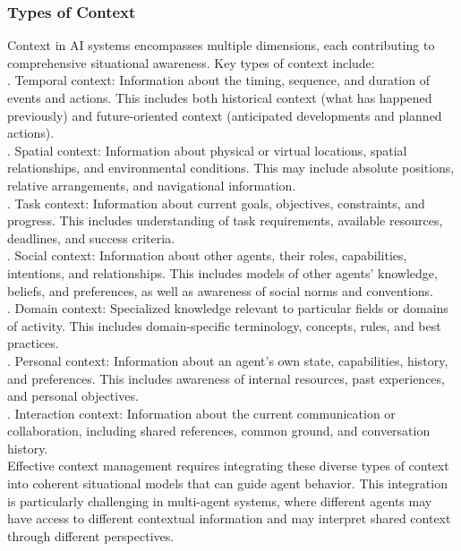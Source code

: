\subsubsection{Types of Context}
Context in AI systems encompasses multiple dimensions, each contributing to comprehensive situational awareness. Key types of context include:\\ . Temporal context: Information about the timing, sequence, and duration of events and actions. This includes both historical context (what has happened previously) and future-oriented context (anticipated developments and planned actions).\\ . Spatial context: Information about physical or virtual locations, spatial relationships, and environmental conditions. This may include absolute positions, relative arrangements, and navigational information.\\ . Task context: Information about current goals, objectives, constraints, and progress. This includes understanding of task requirements, available resources, deadlines, and success criteria.\\ . Social context: Information about other agents, their roles, capabilities, intentions, and relationships. This includes models of other agents' knowledge, beliefs, and preferences, as well as awareness of social norms and conventions.\\ . Domain context: Specialized knowledge relevant to particular fields or domains of activity. This includes domain-specific terminology, concepts, rules, and best practices.\\ . Personal context: Information about an agent's own state, capabilities, history, and preferences. This includes awareness of internal resources, past experiences, and personal objectives.\\ . Interaction context: Information about the current communication or collaboration, including shared references, common ground, and conversation history.\\ \newline
Effective context management requires integrating these diverse types of context into coherent situational models that can guide agent behavior. This integration is particularly challenging in multi-agent systems, where different agents may have access to different contextual information and may interpret shared context through different perspectives.\\
